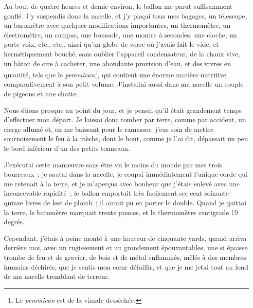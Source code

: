 \documentclass[french,twoside]{book} %
\begin{document}
Au bout de quatre heures et demie environ, le ballon me parut suffisamment gonflé. J’y suspendis donc la nacelle, et j’y plaçai tous mes bagages, un télescope, un baromètre avec quelques modifications importantes, un thermomètre, un électromètre, un compas, une boussole, une montre à secondes, une cloche, un porte-voix, etc., etc., ainsi qu’un globe de verre où j’avais fait le vide, et hermétiquement bouché, sans oublier l’appareil condensateur, de la chaux vive, un bâton de cire à cacheter, une abondante provision d’eau, et des vivres en quantité, tels que le \emph{pemmican}\footnote{Le \emph{pemmican} est de la viande desséchée.}, qui contient une énorme matière nutritive comparativement à son petit volume. J’installai aussi dans ma nacelle un couple de pigeons et une chatte.\par
Nous étions presque au point du jour, et je pensai qu’il était grandement temps d’effectuer mon départ. Je laissai donc tomber par terre, comme par accident, un cierge allumé et, en me baissant pour le ramasser, j’eus soin de mettre sournoisement le feu à la mèche, dont le bout, comme je l’ai dit, dépassait un peu le bord inférieur d’un des petits tonneaux.\par
J’exécutai cette manœuvre sans être vu le moins du monde par mes trois bourreaux ; je sautai dans la nacelle, je coupai immédiatement l’unique corde qui me retenait à la terre, et je m’aperçus avec bonheur que j’étais enlevé avec une inconcevable rapidité ; le ballon emportait très facilement ses cent soixante-quinze livres de lest de plomb ; il aurait pu en porter le double. Quand je quittai la terre, le baromètre marquait trente pouces, et le thermomètre centigrade 19 degrés.\par
Cependant, j’étais à peine monté à une hauteur de cinquante yards, quand arriva derrière moi, avec un rugissement et un grondement épouvantables, une si épaisse trombe de feu et de gravier, de bois et de métal enflammés, mêlés à des membres humains déchirés, que je sentis mon cœur défaillir, et que je me jetai tout au fond de ma nacelle tremblant de terreur.\par
\end{document}
